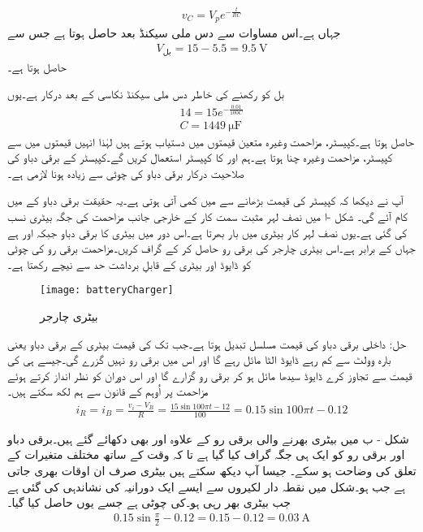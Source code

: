 \begin{align*}
v_C=V_p e^{-\frac{t}{RC}}
\end{align*}
جہاں  ہے۔اس مساوات سے دس ملی سیکنڈ بعد  حاصل ہوتا ہے جس سے
\begin{align*}
V_{\text{بل}}=15-5.5=\SI{9.5}{\volt}
\end{align*}
حاصل ہوتا ہے۔

بل کو  رکھنے کی خاطر دس ملی سیکنڈ نکاسی کے بعد  درکار ہے۔یوں
\begin{align*}
14=15 e^{-\frac{0.01}{100 C}}\\
C=\SI{1449}{\micro \farad}
\end{align*}
حاصل ہوتا ہے۔کپیسٹر، مزاحمت وغیرہ متعین قیمتوں میں دستیاب ہوتے ہیں لہٰذا انہیں قیمتوں میں سے کپیسٹر، مزاحمت وغیرہ چنا ہوتا ہے۔ہم  اور  کا کپیسٹر استعمال کریں گے۔کپیسٹر کے برقی دباو کی صلاحیت درکار برقی دباو کی چوٹی سے زیادہ ہونا لازمی ہے۔ 

آپ نے دیکھا کہ کپیسٹر کی قیمت بڑھانے سے  میں کمی آتی ہوتی ہے۔یہ حقیقت برقی دباو کے  میں کام آئے گی۔
شکل -ا میں نصف لہر مثبت سمت کار کے خارجی جانب مزاحمت کی جگہ  بیٹری نسب کی گئی ہے۔یوں نصف لہر کار بیٹری میں بار بھرتا ہے۔اس دور میں بیٹری کا برقی دباو  جبکہ  اور  ہے جہاں  کے برابر ہے۔اس بیٹری چارجر کی برقی رو  حاصل کر کے گراف کریں۔مزاحمت  برقی رو کی چوٹی کو ڈایوڈ اور بیٹری کے قابلِ برداشت حد سے نیچے رکھتا ہے۔
\begin{figure}
\centering
\texttt{[image: batteryCharger]}
\caption{بیٹری چارجر}
\label{شکل_بیٹری_چارجر}
\end{figure}
حل:	داخلی برقی دباو  کی قیمت مسلسل تبدیل ہوتا ہے۔جب تک  کی قیمت بیٹری کے برقی دباو یعنی بارہ وولٹ سے کم رہے ڈایوڈ الٹا مائل رہے گا اور اس میں برقی رو نہیں گزرے گی۔جیسے ہی  کی قیمت   سے تجاوز کرے ڈایوڈ سیدھا مائل ہو کر برقی رو گزارے گا اور اس دوران   کو نظر انداز کرتے ہوئے مزاحمت پر  اُوہم کے قانون سے ہم لکھ سکتے ہیں۔
\begin{align*}
i_R=i_B=\frac{v_i-V_B}{R}=\frac{15 \sin 100 \pi t -12 }{100}=0.15 \sin  100 \pi t -0.12
\end{align*}

شکل   - ب میں بیٹری بھرنے والی برقی رو  کے علاوہ  اور  بھی دکھائے گئے ہیں۔برقی دباو اور برقی رو کو ایک ہی جگہ گراف کیا گیا ہے تا کہ وقت  کے ساتھ مختلف متغیرات کے تعلق کی وضاحت ہو سکے۔ جیسا آپ دیکھ سکتے ہیں بیٹری صرف ان اوقات بھری جاتی ہے جب  ہو۔شکل میں نقطہ دار لکیروں سے ایسے ایک دورانیہ کی نشاندہی کی گئی ہے  جب بیٹری بھر رہی ہو۔کی چوٹی  ہے جسے  یوں حاصل کیا گیا۔
\begin{align*}
0.15 \sin \frac{\pi}{2}-0.12=0.15-0.12=\SI{0.03}{\ampere}
\end{align*}

